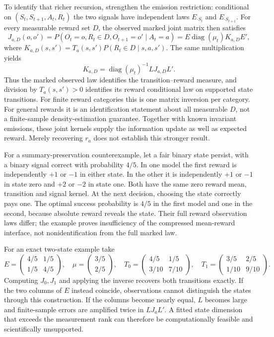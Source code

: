 To identify that richer recursion, strengthen the emission restriction:
conditional on $(S_t,S_{t+1},A_t,R_t)$ the two signals have independent
laws $E_{\cdot S_t}$ and $E_{\cdot S_{t+1}}$. For every measurable
reward set $D$, the observed marked joint matrix then satisfies
\[
 J_{a,D}(o,o')
 =P(O_t=o,R_t\in D,O_{t+1}=o'\mid A_t=a)
 =E\operatorname{diag}(\mu_t)K_{a,D}E',
\]
where
$K_{a,D}(s,s')=T_a(s,s')P(R_t\in D\mid s,a,s')$.
The same multiplication yields
\[
 K_{a,D}=\operatorname{diag}(\mu_t)^{-1}LJ_{a,D}L'.
\]
Thus the marked observed law identifies the transition--reward measure,
and division by $T_a(s,s')>0$ identifies its reward conditional law
on supported state transitions. For finite reward categories this is
one matrix inversion per category. For general rewards it is an
identification statement about all measurable $D$, not a finite-sample
density-estimation guarantee. Together with known invariant emissions,
these joint kernels supply the information update as well as expected
reward. Merely recovering $r_a$ does not establish this stronger result.

For a summary-preservation counterexample, let a fair binary state persist,
with a binary signal correct with probability $4/5$. In one model the
first reward is independently $+1$ or $-1$ in either state. In the
other it is independently $+1$ or $-1$ in state zero and $+2$ or $-2$
in state one. Both have the same zero reward mean, transition and signal
kernel. At the next decision, choosing the state correctly pays one.
The optimal success probability is $4/5$ in the first model and one in
the second, because absolute reward reveals the state. Their full reward
observation laws differ; the example proves insufficiency of the compressed
mean-reward interface, not nonidentification from the full marked law.

For an exact two-state example take
\[
 E=\begin{pmatrix}4/5&1/5\\1/5&4/5\end{pmatrix},\quad
 \mu=\begin{pmatrix}3/5\\2/5\end{pmatrix},\quad
 T_0=\begin{pmatrix}4/5&1/5\\3/10&7/10\end{pmatrix},\quad
 T_1=\begin{pmatrix}3/5&2/5\\1/10&9/10\end{pmatrix}.
\]
Computing $J_0,J_1$ and applying the inverse recovers both transitions
exactly. If the two columns of $E$ instead coincide, observations
cannot distinguish the states through this construction. If the
columns become nearly equal, $L$ becomes large and finite-sample
errors are amplified twice in $LJ_aL'$. A fitted state dimension
that exceeds the measurement rank can therefore be computationally
feasible and scientifically unsupported.

